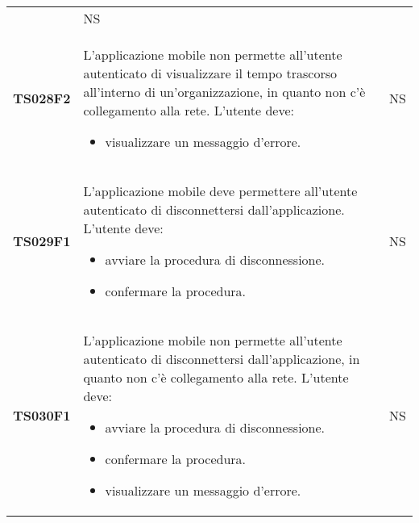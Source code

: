 \documentclass[../piano-di-qualifica.tex]{subfiles}
\begin{document}
\begin{centering}
\begin{longtable}[H]{>{\centering\bfseries}m{3cm} >{}p{10cm} >{\centering\arraybackslash}m{3cm}}
\begin{itemize}
    \end{itemize}
                       & NS                                                                                                                                                                                                                                                               \\
    TS028F2            & L'applicazione mobile non permette all'utente autenticato di visualizzare il tempo trascorso all'interno di un'organizzazione, in quanto non c'è collegamento alla rete. \newline
    L'utente deve:
    \begin{itemize}
      \item visualizzare un messaggio d'errore.
    \end{itemize}
                       & NS                                                                                                                                                                                                                                                               \\
    TS029F1            & L'applicazione mobile deve permettere all'utente autenticato di disconnettersi dall'applicazione. \newline
    L'utente deve:
    \begin{itemize}
      \item avviare la procedura di disconnessione.
      \item confermare la procedura.
    \end{itemize}
                       & NS                                                                                                                                                                                                                                                               \\
    TS030F1            & L'applicazione mobile non permette all'utente autenticato di disconnettersi dall'applicazione, in quanto non c'è collegamento alla rete. \newline
    L'utente deve:
    \begin{itemize}
      \item avviare la procedura di disconnessione.
      \item confermare la procedura.
      \item visualizzare un messaggio d'errore.
    \end{itemize}
                       & NS                                                                                                                                                                                                                                                               \\

\end{longtable}
\end{centering}
\end{document}
